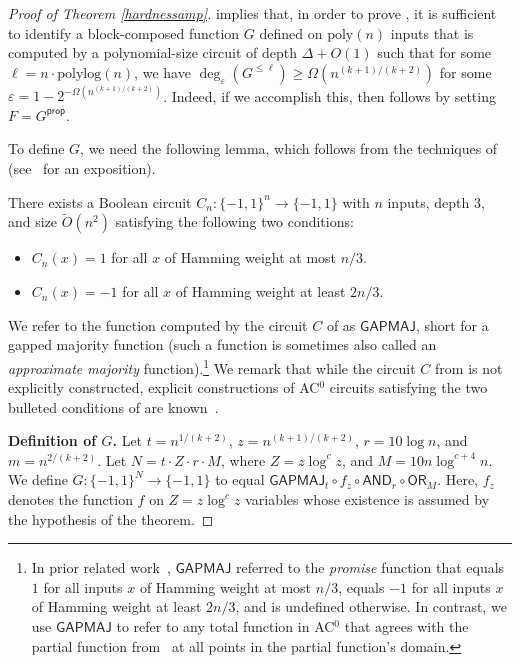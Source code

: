 \documentclass{toc}
\newcommand{\poly}{\mathrm{poly}}
\newcommand{\polylog}{\mathrm{polylog}}
\newcommand{\OR}{\mathsf{ OR}}
\newcommand{\GAPMAJ}{\mathsf{GAPMAJ}}
\newcommand{\bits}{\{-1,1\}}
\newcommand{\tO}{\tilde{O}}
\newcommand{\eps}{\varepsilon}
\newcommand{\AND}{\mathsf{AND}}
\begin{document}
%
\begin{proof}[Proof of Theorem \ref{hardnessamp}] 
	 implies that, in order to prove , 
	it is sufficient to identify a block-composed function $G$ defined on $\poly(n)$ inputs that is computed by a 
polynomial-size %
circuit of depth $\Delta+O(1)$ such that for some $\ell=n\cdot\polylog(n)$, we have $\deg_{\eps}(G^{\leq \ell}) \geq \Omega(n^{(k+1)/(k+2)})$
	for some $\eps=1-2^{-\Omega\left(n^{(k+1)/(k+2)}\right)}$. Indeed, if we accomplish this,
	then  follows by setting $F=G^{\mathsf{prop}}$.
	
	To define $G$, we need the following lemma, which follows from the techniques of~\cite{AB84} (see~\cite{Kop13} for an exposition).
	
	\begin{lemma}\label{lem:gapmaj}
  There exists a Boolean circuit $C_n \colon \bits^n \to \bits$ with $n$ 
inputs, depth 3, and size $\tO(n^2)$ satisfying the following two
conditions:
		\begin{itemize}
	\item $C_n(x) = 1$ for all $x$ of Hamming weight at most $n/3$.
	\item $C_n(x) = -1$ for all $x$ of Hamming weight at least $2n/3$.
		\end{itemize}
	\end{lemma}

	We refer to the function computed by the circuit $C$ of  as $\mathsf{GAPMAJ}$, short for a gapped majority function (such a function is sometimes also called an \emph{approximate majority} function).\footnote{In prior related work~\cite{bchtv}, $\mathsf{GAPMAJ}$ referred
		to the \emph{promise} function that equals $1$ for all inputs $x$ of Hamming weight at most $n/3$, equals  $-1$ for all inputs $x$ of Hamming weight at least $2n/3$,
		and is undefined otherwise. In contrast, we use $\mathsf{GAPMAJ}$ to refer to any total function in AC$^0$ that agrees with the partial function
		from~\cite{bchtv} at all points in the partial function's domain.} We remark that while the circuit $C$ from  is not explicitly constructed,
explicit constructions of AC$^0$ circuits satisfying the two bulleted
conditions 
of  are known~\cite{viola2009approximate}.
	
	\medskip
	\noindent \textbf{Definition of $G$.} Let $t=n^{1/(k+2)}$, $z=n^{(k+1)/(k+2)}$, $r=10 \log n$, and $m=n^{2/(k+2)}$. Let $N= t \cdot Z \cdot r \cdot M$, where $Z = z \log ^c z$, and $M = 10n\log^{c+4}n$.
	We define $G \colon \bits^N \to \bits$ to equal $\GAPMAJ_t \circ f_z \circ \AND_r \circ \OR_M$. Here, $f_z$ denotes 
	the function $f$ on $Z = z \log^c z$ variables whose existence is assumed by the hypothesis of the theorem.
	

\end{proof}
\end{document}
